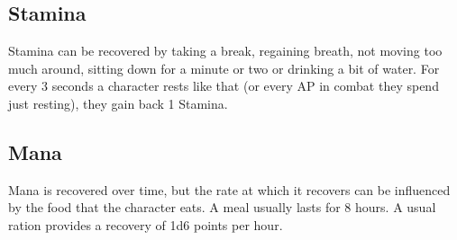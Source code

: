 \subsection{Stamina}\label{subsec:recoverStamina}
Stamina can be recovered by taking a break, regaining breath, not moving too much around, sitting down for a minute or two or drinking a bit of water.
For every 3 seconds a character rests like that (or every AP in combat they spend just resting), they gain back 1 Stamina.


\subsection{Mana}\label{subsec:recoverMana}
Mana is recovered over time, but the rate at which it recovers can be influenced by the food that the character eats.
A meal usually lasts for 8 hours.
A usual ration provides a recovery of 1d6 points per hour.